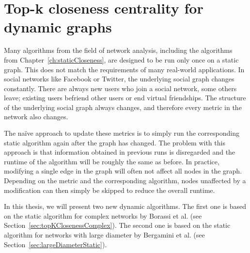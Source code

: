 \chapter{Top-k closeness centrality for dynamic graphs}
\label{ch:dynamicCloseness}

Many algorithms from the field of network analysis, including the algorithms from Chapter~\ref{ch:staticCloseness}, are designed to be run only once on a static graph. This does not match the requirements of many real-world applications. In social networks like Facebook or Twitter, the underlying social graph changes constantly. There are always new users who join a social network, some others leave; existing users befriend other users or end virtual friendships. The structure of the underlying social graph always changes, and therefore every metric in the network also changes.

The na\"ive approach to update these metrics is to simply run the corresponding static algorithm again after the graph has changed. The problem with this approach is that information obtained in previous runs is disregarded and the runtime of the algorithm will be roughly the same as before. In practice, modifying a single edge in the graph will often not affect all nodes in the graph. Depending on the metric and the corresponding algorithm, nodes unaffected by a modification can then simply be skipped to reduce the overall runtime.

In this thesis, we will present two new dynamic algorithms. The first one is based on the static algorithm for complex networks by Borassi et al. (see Section~\ref{sec:topKClosenessComplex}). The second one is based on the static algorithm for networks with large diameter by Bergamini et al. (see Section~\ref{sec:largeDiameterStatic}).

